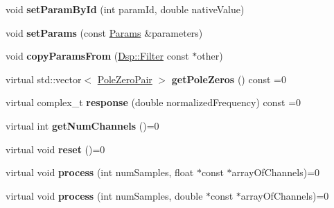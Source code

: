\begin{DoxyCompactItemize}
\item 
\hypertarget{classDsp_1_1Filter_a686ec519f72571986669f1d3055fd326}{void {\bfseries set\-Param\-By\-Id} (int param\-Id, double native\-Value)}\label{classDsp_1_1Filter_a686ec519f72571986669f1d3055fd326}

\item 
\hypertarget{classDsp_1_1Filter_abff1905cda4b9c35a60f2326c3224f05}{void {\bfseries set\-Params} (const \hyperlink{structDsp_1_1Params}{Params} \&parameters)}\label{classDsp_1_1Filter_abff1905cda4b9c35a60f2326c3224f05}

\item 
\hypertarget{classDsp_1_1Filter_ab96d4f308c2e79fed96d39c386899dfa}{void {\bfseries copy\-Params\-From} (\hyperlink{classDsp_1_1Filter}{Dsp\-::\-Filter} const $\ast$other)}\label{classDsp_1_1Filter_ab96d4f308c2e79fed96d39c386899dfa}

\item 
\hypertarget{classDsp_1_1Filter_a12beefe9f8f15d81ce1d4216b58c9d91}{virtual std\-::vector$<$ \hyperlink{structDsp_1_1PoleZeroPair}{Pole\-Zero\-Pair} $>$ {\bfseries get\-Pole\-Zeros} () const =0}\label{classDsp_1_1Filter_a12beefe9f8f15d81ce1d4216b58c9d91}

\item 
\hypertarget{classDsp_1_1Filter_af69ef35232ed598239099d855ef8373b}{virtual complex\-\_\-t {\bfseries response} (double normalized\-Frequency) const =0}\label{classDsp_1_1Filter_af69ef35232ed598239099d855ef8373b}

\item 
\hypertarget{classDsp_1_1Filter_a59d87b50e0a5a791ca487d92470c6c50}{virtual int {\bfseries get\-Num\-Channels} ()=0}\label{classDsp_1_1Filter_a59d87b50e0a5a791ca487d92470c6c50}

\item 
\hypertarget{classDsp_1_1Filter_a707387e3d4e692d786d94c5f6f54d5af}{virtual void {\bfseries reset} ()=0}\label{classDsp_1_1Filter_a707387e3d4e692d786d94c5f6f54d5af}

\item 
\hypertarget{classDsp_1_1Filter_afb21d214b2e7496bb59669422985121e}{virtual void {\bfseries process} (int num\-Samples, float $\ast$const $\ast$array\-Of\-Channels)=0}\label{classDsp_1_1Filter_afb21d214b2e7496bb59669422985121e}

\item 
\hypertarget{classDsp_1_1Filter_a182436aa7700bdd3362855fef683c0da}{virtual void {\bfseries process} (int num\-Samples, double $\ast$const $\ast$array\-Of\-Channels)=0}\label{classDsp_1_1Filter_a182436aa7700bdd3362855fef683c0da}

\end{DoxyCompactItemize}
